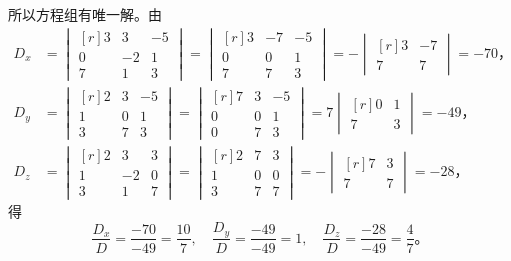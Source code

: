 所以方程组有唯一解。由
\begin{align*}
    D_x &= \begin{vmatrix*}[r]
            3 & 3  & -5 \\
            0 & -2 & 1 \\
            7 & 1  & 3
        \end{vmatrix*} = \begin{vmatrix*}[r]
            3 & -7 & -5 \\
            0 & 0  & 1 \\
            7 & 7  & 3
        \end{vmatrix*} = - \begin{vmatrix*}[r]
            3 & -7 \\
            7 & 7
        \end{vmatrix*} = -70 \text{，} \\
    D_y &= \begin{vmatrix*}[r]
            2 & 3 & -5 \\
            1 & 0 & 1 \\
            3 & 7 & 3
        \end{vmatrix*} = \begin{vmatrix*}[r]
            7 & 3 & -5 \\
            0 & 0 & 1 \\
            0 & 7 & 3
        \end{vmatrix*} = 7 \begin{vmatrix*}[r]
            0 & 1 \\
            7 & 3
        \end{vmatrix*} = -49 \text{，} \\
    D_z &= \begin{vmatrix*}[r]
            2 & 3  & 3 \\
            1 & -2 & 0 \\
            3 & 1  & 7
        \end{vmatrix*} = \begin{vmatrix*}[r]
            2 & 7 & 3 \\
            1 & 0 & 0 \\
            3 & 7 & 7
        \end{vmatrix*} = - \begin{vmatrix*}[r]
            7 & 3 \\
            7 & 7
        \end{vmatrix*} = -28 \text{，}
\end{align*}
得
$$
    \dfrac{D_x}{D} = \dfrac{-70}{-49} = \dfrac{10}{7},\quad
    \dfrac{D_y}{D} = \dfrac{-49}{-49} = 1,\quad
    \dfrac{D_z}{D} = \dfrac{-28}{-49} = \dfrac{4}{7} \text{。}
$$

